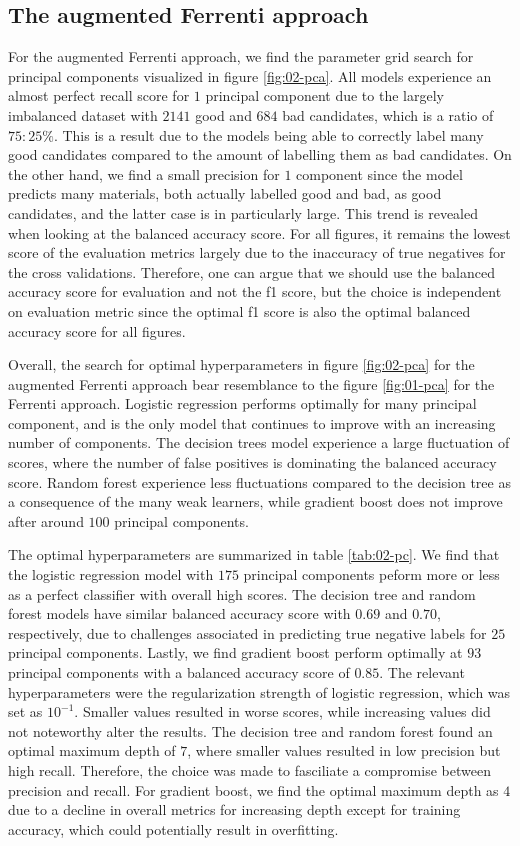 \subsection{The augmented Ferrenti approach}

For the augmented Ferrenti approach, we find the parameter grid search for principal components visualized in figure \ref{fig:02-pca}. All models experience an almost perfect recall score for $1$ principal component due to the largely imbalanced dataset with $2141$ good and $684$ bad candidates, which is a ratio of $75:25 \%$. This is a result due to the models being able to correctly label many good candidates compared to the amount of labelling them as bad candidates. On the other hand, we find a small precision for $1$ component since the model predicts many materials, both actually labelled good and bad, as good candidates, and the latter case is in particularly large. This trend is revealed when looking at the balanced accuracy score. For all figures, it remains the lowest score of the evaluation metrics largely due to the inaccuracy of true negatives for the cross validations. Therefore, one can argue that we should use the balanced accuracy score for evaluation and not the f1 score, but the choice is independent on evaluation metric since the optimal f1 score is also the optimal balanced accuracy score for all figures.

Overall, the search for optimal hyperparameters in figure \ref{fig:02-pca} for the augmented Ferrenti approach bear resemblance to the figure \ref{fig:01-pca} for the Ferrenti approach. Logistic regression performs optimally for many principal component, and is the only model that continues to improve with an increasing number of components. The decision trees model experience a large fluctuation of scores, where the number of false positives is dominating the balanced accuracy score. Random forest experience less fluctuations compared to the decision tree as a consequence of the many weak learners, while gradient boost does not improve after around $100$ principal components.

The optimal hyperparameters are summarized in table \ref{tab:02-pc}. We find that the logistic regression model with $175$ principal components peform more or less as a perfect classifier with overall high scores. The decision tree and random forest models have similar balanced accuracy score with $0.69$ and $0.70$, respectively, due to challenges associated in predicting true negative labels for $25$ principal components. Lastly, we find gradient boost perform optimally at $93$ principal components with a balanced accuracy score of $0.85$. The relevant hyperparameters were the regularization strength of logistic regression, which was set as $10^{-1}$. Smaller values resulted in worse scores, while increasing values did not noteworthy alter the results. The decision tree and random forest found an optimal maximum depth of $7$, where smaller values resulted in low precision but high recall. Therefore, the choice was made to fasciliate a compromise between precision and recall. For gradient boost, we find the optimal maximum depth as $4$ due to a decline in overall metrics for increasing depth except for training accuracy, which could potentially result in overfitting.


